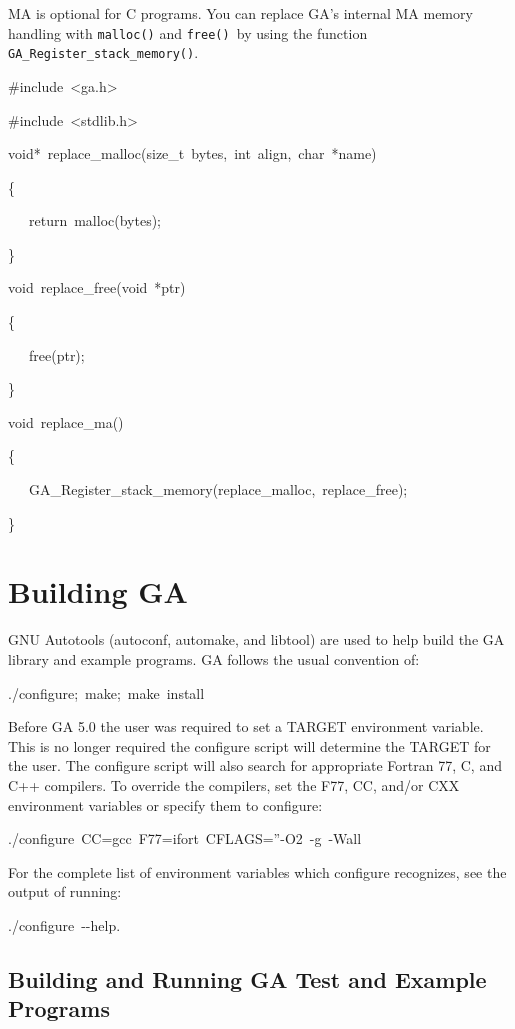 MA is optional for C programs. You can replace GA\textquoteright{}s
internal MA memory handling with \texttt{malloc()} and \texttt{free()
}by using the function \texttt{GA\_Register\_stack\_memory()}.
\begin{lyxcode}
\#include~<ga.h>~

\#include~<stdlib.h>

void{*}~replace\_malloc(size\_t~bytes,~int~align,~char~{*}name)~

\{~

~~~return~malloc(bytes);~

\}

void~replace\_free(void~{*}ptr)~

\{~

~~~free(ptr);~

\}

void~replace\_ma()~

\{~

~~~GA\_Register\_stack\_memory(replace\_malloc,~replace\_free);~

\}~
\end{lyxcode}

\section{Building GA }

GNU Autotools (autoconf, automake, and libtool) are used to help build
the GA library and example programs. GA follows the usual convention
of:
\begin{lyxcode}
./configure;~make;~make~install~
\end{lyxcode}
Before GA 5.0 the user was required to set a TARGET environment variable.
This is no longer required \textendash{} the configure script will
determine the TARGET for the user. The configure script will also
search for appropriate Fortran 77, C, and C++ compilers. To override
the compilers, set the F77, CC, and/or CXX environment variables or
specify them to configure:
\begin{lyxcode}
./configure~CC=gcc~F77=ifort~CFLAGS=\textquotedblright{}-O2~-g~-Wall\textquotedbl{}
\end{lyxcode}
For the complete list of environment variables which configure recognizes,
see the output of running: 
\begin{lyxcode}
./configure~-{}-help.~
\end{lyxcode}

\subsection{Building and Running GA Test and Example Programs }

